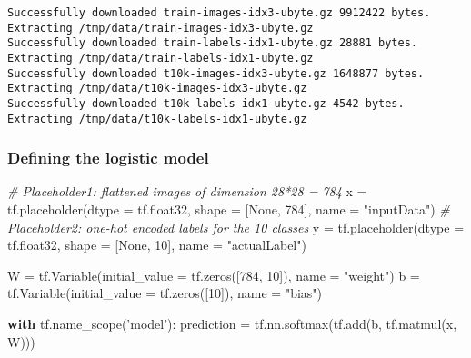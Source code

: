 \documentclass[11pt]{article}
\newenvironment{Shaded}{}{}
\newcommand{\DecValTok}[1]{\textcolor[rgb]{0.25,0.63,0.44}{{#1}}}
\newcommand{\StringTok}[1]{\textcolor[rgb]{0.25,0.44,0.63}{{#1}}}
\newcommand{\CommentTok}[1]{\textcolor[rgb]{0.38,0.63,0.69}{\textit{{#1}}}}
\newcommand{\NormalTok}[1]{{#1}}
\newcommand{\VariableTok}[1]{\textcolor[rgb]{0.10,0.09,0.49}{{#1}}}
\newcommand{\ControlFlowTok}[1]{\textcolor[rgb]{0.00,0.44,0.13}{\textbf{{#1}}}}
\newcommand{\OperatorTok}[1]{\textcolor[rgb]{0.40,0.40,0.40}{{#1}}}
\begin{document}
    \begin{Verbatim}[commandchars=\\\{\}]
Successfully downloaded train-images-idx3-ubyte.gz 9912422 bytes.
Extracting /tmp/data/train-images-idx3-ubyte.gz
Successfully downloaded train-labels-idx1-ubyte.gz 28881 bytes.
Extracting /tmp/data/train-labels-idx1-ubyte.gz
Successfully downloaded t10k-images-idx3-ubyte.gz 1648877 bytes.
Extracting /tmp/data/t10k-images-idx3-ubyte.gz
Successfully downloaded t10k-labels-idx1-ubyte.gz 4542 bytes.
Extracting /tmp/data/t10k-labels-idx1-ubyte.gz

    \end{Verbatim}

    \subsubsection{Defining the logistic
model}\label{defining-the-logistic-model}

    \begin{Shaded}
\begin{Highlighting}[]
\CommentTok{# Placeholder1: flattened images of dimension 28*28 = 784}
\NormalTok{x }\OperatorTok{=}\NormalTok{ tf.placeholder(dtype }\OperatorTok{=}\NormalTok{ tf.float32, shape }\OperatorTok{=}\NormalTok{ [}\VariableTok{None}\NormalTok{, }\DecValTok{784}\NormalTok{], name }\OperatorTok{=} \StringTok{"inputData"}\NormalTok{) }
\CommentTok{# Placeholder2: one-hot encoded labels for the 10 classes}
\NormalTok{y }\OperatorTok{=}\NormalTok{ tf.placeholder(dtype }\OperatorTok{=}\NormalTok{ tf.float32, shape }\OperatorTok{=}\NormalTok{ [}\VariableTok{None}\NormalTok{, }\DecValTok{10}\NormalTok{], name }\OperatorTok{=} \StringTok{"actualLabel"}\NormalTok{)}

\NormalTok{W }\OperatorTok{=}\NormalTok{ tf.Variable(initial_value }\OperatorTok{=}\NormalTok{ tf.zeros([}\DecValTok{784}\NormalTok{, }\DecValTok{10}\NormalTok{]), name }\OperatorTok{=} \StringTok{"weight"}\NormalTok{)}
\NormalTok{b }\OperatorTok{=}\NormalTok{ tf.Variable(initial_value }\OperatorTok{=}\NormalTok{ tf.zeros([}\DecValTok{10}\NormalTok{]), name }\OperatorTok{=} \StringTok{"bias"}\NormalTok{)}

\ControlFlowTok{with}\NormalTok{ tf.name_scope(}\StringTok{'model'}\NormalTok{):}
\NormalTok{    prediction }\OperatorTok{=}\NormalTok{ tf.nn.softmax(tf.add(b, tf.matmul(x, W))) }
\end{Highlighting}
\end{Shaded}
\end{document}
